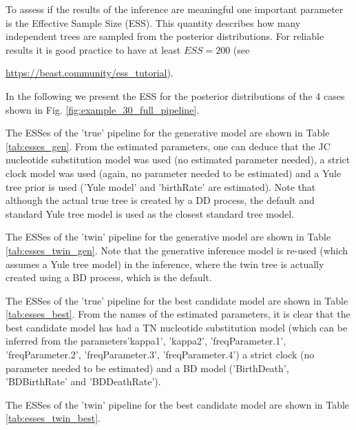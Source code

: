 To assess if the results of the inference are meaningful one important 
parameter is the Effective Sample Size (ESS). This quantity describes how 
many independent trees are sampled from the posterior distributions. 
For reliable results it is good practice to have at 
least $ESS = 200$ (see 
\begin{sloppypar}
  \url{https://beast.community/ess_tutorial}).
\end{sloppypar}
In the following we present the ESS for the posterior distributions of 
the 4 cases shown in Fig. \ref{fig:example_30_full_pipeline}.

The ESSes of the 'true' pipeline for the generative model
are shown in Table \ref{tab:esses_gen}.
From the estimated parameters, one can deduce that
the JC nucleotide substitution model was used (no
estimated parameter needed), a strict clock model was 
used (again, no parameter needed to be estimated)
and a Yule tree prior is used ('Yule model' and 'birthRate' are estimated).
Note that although the actual true tree is created by a DD process, 
the default and standard Yule tree model is used as the closest
standard tree model.



\newpage

The ESSes of the 'twin' pipeline for the generative model
are shown in Table \ref{tab:esses_twin_gen}.
Note that the generative inference model is 
re-used (which assumes a Yule tree model) in the inference, 
where the twin tree is actually created using a BD process,
which is the default.



\newpage

The ESSes of the 'true' pipeline for the best candidate model
are shown in Table \ref{tab:esses_best}. 
From the names of the estimated parameters, it is clear that
the best candidate model has had a TN nucleotide substitution 
model (which can be inferred from the parameters'kappa1', 'kappa2', 'freqParameter.1', 
'freqParameter.2', 'freqParameter.3', 'freqParameter.4')
a strict clock (no parameter needed to be estimated) and a BD 
model ('BirthDeath', 'BDBirthRate' and 'BDDeathRate').



\newpage

The ESSes of the 'twin' pipeline for the best candidate model
are shown in Table \ref{tab:esses_twin_best}.

